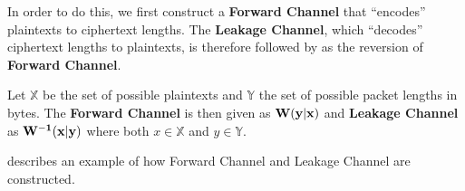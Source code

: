 In order to do this, we first construct a  \textbf{Forward Channel} that “encodes” plaintexts to ciphertext lengths. The \textbf{Leakage Channel}, which “decodes” ciphertext lengths to plaintexts, is therefore followed by as the reversion of \textbf{Forward Channel}.

\begin{definition} \label{Def: Channels}
Let $\mathbb{X}$ be the set of possible plaintexts and $\mathbb{Y}$ the set of possible packet lengths in bytes. The \textbf{Forward Channel} is then given as  $\bf{W(y|x)}$ and \textbf{Leakage Channel} as $\bf{W^{-1}(x|y)}$ where both $x \in \mathbb{X}$ and $y \in \mathbb{Y}$.
\end{definition}

 describes an example of how Forward Channel and Leakage Channel are constructed.

